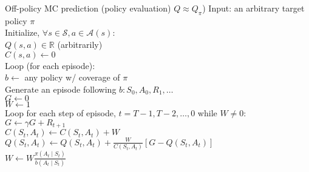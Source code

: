 \documentclass[twocolumn]{article}
\begin{document}
\begin{mydef}{Off-policy MC prediction (policy evaluation) $Q \approx Q_\pi$)}{}
    Input: an arbitrary target policy $\pi$ \\
    
    Initialize, $\forall s \in \mathcal S, a \in \mathcal A(s)$: \\
        \hspace*{2em}$Q(s,a) \in \mathbb R$ (arbitrarily) \\
        \hspace*{2em}$C(s,a) \leftarrow 0$ \\
    
        Loop (for each episode): \\
            \hspace*{2em}$b\leftarrow$ any policy w/ coverage of $\pi$ \\
            \hspace*{2em}Generate an episode following $b: S_0, A_0, R_1, \dots$ \\
            \hspace*{2em}$G \leftarrow 0$ \\
            \hspace*{2em}$W \leftarrow 1$ \\
            \hspace*{2em}Loop for each step of episode, $t = T-1, T-2, \dots, 0$ while $W \neq 0$: \\
                \hspace*{4em}$G \leftarrow \gamma G + R_{t+1}$ \\
                \hspace*{4em}$C(S_t, A_t) \leftarrow C(S_t, A_t) + W$ \\
                \hspace*{4em}$Q(S_t, A_t) \leftarrow Q(S_t, A_t) + \frac{W}{C(S_t, A_t)} [G - Q(S_t, A_t)]$ \\
                \hspace*{4em}$W \leftarrow W \frac{\pi(A_t \mid S_t)}{b(A_t \mid S_t)}$
\end{mydef}
\end{document}
